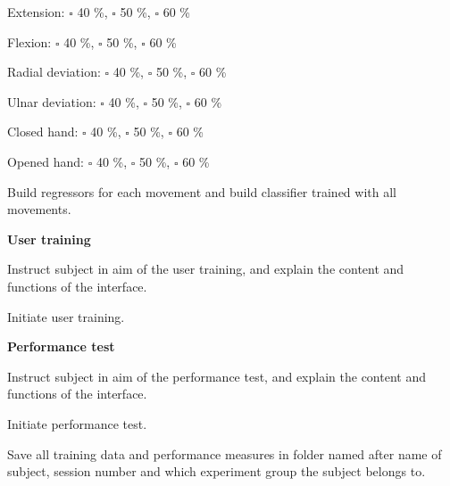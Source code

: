 \begin{todolist}
	\begin{todolist}
		\item Extension: $\square$ 40 \%, $\square$ 50 \%, $\square$ 60 \%
		\item Flexion: $\square$ 40 \%, $\square$ 50 \%, $\square$ 60 \%
		\item Radial deviation: $\square$ 40 \%, $\square$ 50 \%, $\square$ 60 \%
		\item Ulnar deviation: $\square$ 40 \%, $\square$ 50 \%, $\square$ 60 \%
		\item Closed hand: $\square$ 40 \%, $\square$ 50 \%, $\square$ 60 \%
		\item Opened hand: $\square$ 40 \%, $\square$ 50 \%, $\square$ 60 \%
	\end{todolist}
	\item Build regressors for each movement and build classifier trained with all movements.
\end{todolist}


\textbf{\large User training}

\begin{todolist}
	\item Instruct subject in aim of the user training, and explain the content and functions of the interface.
	\item Initiate user training.
\end{todolist}

\textbf{\large Performance test}

\begin{todolist}
	\item Instruct subject in aim of the performance test, and explain the content and functions of the interface.
	\item Initiate performance test.
	\item Save all training data and performance measures in folder named after name of subject, session number and which experiment group the subject belongs to.
\end{todolist}


